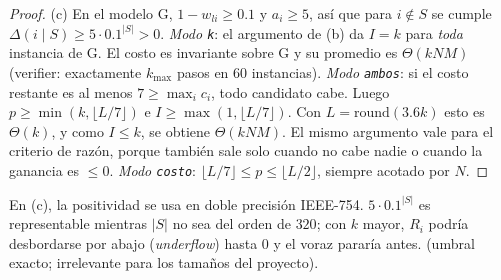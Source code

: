 \begin{proof}
(c) En el modelo G, $1-w_{li}\ge0.1$ y $a_i\ge5$, así que para $i\notin S$ se cumple $\Delta(i\mid S)\ge5\cdot0.1^{|S|}>0$. \emph{Modo \texttt{k}}: el argumento de (b) da $I=k$ para \emph{toda} instancia de G. El costo es invariante sobre G y su promedio es $\Theta(kNM)$ (verifier: exactamente $k_{\max}$ pasos en 60 instancias). \emph{Modo \texttt{ambos}}: si el costo restante es al menos $7\ge\max_ic_i$, todo candidato cabe. Luego $p\ge\min(k,\lfloor L/7\rfloor)$ e $I\ge\max(1,\lfloor L/7\rfloor)$. Con $L=\mathrm{round}(3.6k)$ esto es $\Theta(k)$, y como $I\le k$, se obtiene $\Theta(kNM)$. El mismo argumento vale para el criterio de razón, porque también sale solo cuando no cabe nadie o cuando la ganancia es $\le0$. \emph{Modo \texttt{costo}}: $\lfloor L/7\rfloor\le p\le\lfloor L/2\rfloor$, siempre acotado por $N$.
\end{proof}
\begin{observacion}
En (c), la positividad se usa en doble precisión IEEE-754. $5\cdot0.1^{|S|}$ es representable mientras $|S|$ no sea del orden de $320$; con $k$ mayor, $R_i$ podría desbordarse por abajo (\emph{underflow}) hasta $0$ y el voraz pararía antes. \VER{} (umbral exacto; irrelevante para los tamaños del proyecto).
\end{observacion}

